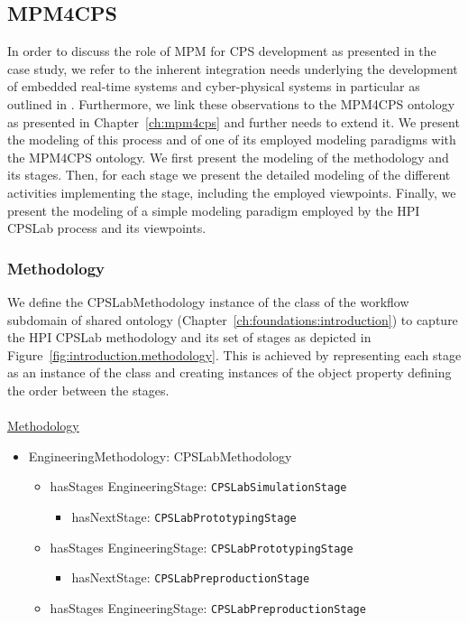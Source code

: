 \subsection{MPM4CPS}\label{subsec:cpslab-mpm4cps}
%
In order to discuss the role of MPM for CPS development as presented in the case study, we refer to the inherent integration needs underlying the development of embedded real-time systems and cyber-physical systems in particular as outlined in \cite{GieseNNS2011}. Furthermore, we link these observations to the MPM4CPS ontology as presented in Chapter~\ref{ch:mpm4cps} and further needs to extend it.
We present the modeling of this process and of one of its employed modeling paradigms with the MPM4CPS ontology. We first present the modeling of the methodology and its stages. Then, for each stage we present the detailed modeling of the different activities implementing the stage, including the employed viewpoints. Finally, we present the modeling of a simple modeling paradigm employed by the HPI CPSLab process and its viewpoints.
\subsubsection{Methodology}

We define the CPSLabMethodology instance of the  class of the workflow subdomain of shared ontology (Chapter~\ref{ch:foundations:introduction}) to capture the HPI CPSLab methodology and its set of stages as depicted in Figure~\ref{fig:introduction.methodology}. This is achieved by representing each stage as an instance of the  class and creating instances of the  object property defining the order between the stages.
\\
\\
\noindent\uline{Methodology}
\begin{itemize}
\item EngineeringMethodology: CPSLabMethodology
\begin{itemize}
    \item hasStages EngineeringStage: \texttt{CPSLabSimulationStage}
    \begin{itemize}
        \item hasNextStage: \texttt{CPSLabPrototypingStage}
    \end{itemize}
    \item hasStages EngineeringStage: \texttt{CPSLabPrototypingStage}
    \begin{itemize}
        \item hasNextStage: \texttt{CPSLabPreproductionStage}
    \end{itemize}
    \item hasStages EngineeringStage: \texttt{CPSLabPreproductionStage}
\end{itemize}
\end{itemize}

